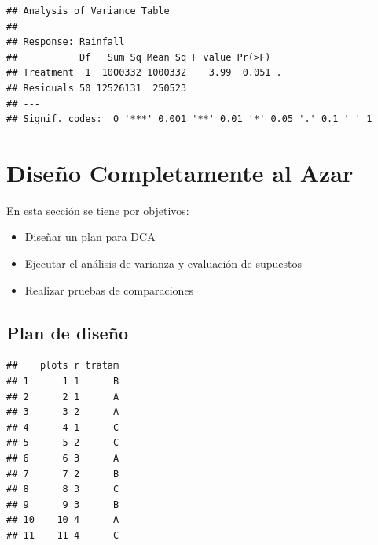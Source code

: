\documentclass[]{book}
\newenvironment{Shaded}{\begin{snugshade}}{\end{snugshade}}
\newcommand{\KeywordTok}[1]{\textcolor[rgb]{0.13,0.29,0.53}{\textbf{#1}}}
\newcommand{\DataTypeTok}[1]{\textcolor[rgb]{0.13,0.29,0.53}{#1}}
\newcommand{\DecValTok}[1]{\textcolor[rgb]{0.00,0.00,0.81}{#1}}
\newcommand{\StringTok}[1]{\textcolor[rgb]{0.31,0.60,0.02}{#1}}
\newcommand{\CommentTok}[1]{\textcolor[rgb]{0.56,0.35,0.01}{\textit{#1}}}
\newcommand{\OperatorTok}[1]{\textcolor[rgb]{0.81,0.36,0.00}{\textbf{#1}}}
\newcommand{\NormalTok}[1]{#1}
\providecommand{\tightlist}{%
  \setlength{\itemsep}{0pt}\setlength{\parskip}{0pt}}
\begin{document}
\begin{verbatim}
## Analysis of Variance Table
## 
## Response: Rainfall
##           Df   Sum Sq Mean Sq F value Pr(>F)  
## Treatment  1  1000332 1000332    3.99  0.051 .
## Residuals 50 12526131  250523                 
## ---
## Signif. codes:  0 '***' 0.001 '**' 0.01 '*' 0.05 '.' 0.1 ' ' 1
\end{verbatim}

\chapter{Diseño Completamente al
Azar}\label{diseno-completamente-al-azar}

En esta sección se tiene por objetivos:

\begin{itemize}
\tightlist
\item
  Diseñar un plan para DCA
\item
  Ejecutar el análisis de varianza y evaluación de supuestos
\item
  Realizar pruebas de comparaciones
\end{itemize}

\section{Plan de diseño}\label{plan-de-diseno}

\begin{Shaded}
\end{Shaded}

\begin{verbatim}
##    plots r tratam
## 1      1 1      B
## 2      2 1      A
## 3      3 2      A
## 4      4 1      C
## 5      5 2      C
## 6      6 3      A
## 7      7 2      B
## 8      8 3      C
## 9      9 3      B
## 10    10 4      A
## 11    11 4      C
\end{verbatim}
\end{document}
